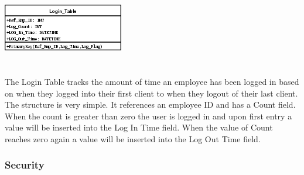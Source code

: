 \documentclass{report}
\begin{document}
    \\
    \\
    \includegraphics{Tables/LoginTable.png}\\
    \\
    \\
    The Login Table tracks the amount of time an employee has been logged in based on when
    they logged into their first client to when they logout of their last client. The structure
    is very simple. It references an employee ID and has a Count field. When the count is greater
    than zero the user is logged in and upon first entry a value will be inserted into the
    Log In Time field. When the value of Count reaches zero again a value will be inserted into
    the Log Out Time field.

    \subsubsection{Security}
\end{document}
